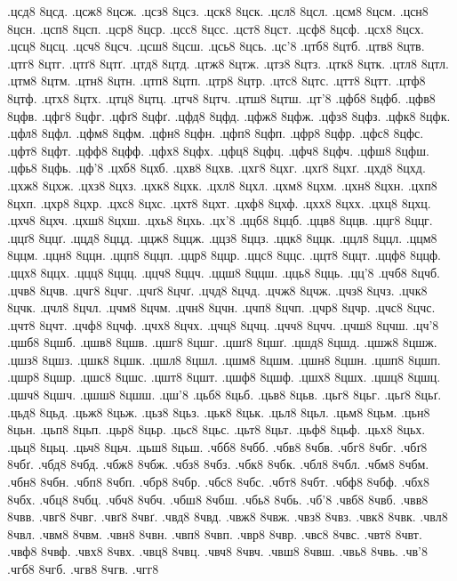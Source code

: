 {.цсд8
8цсд.
.цсж8
8цсж.
.цсз8
8цсз.
.цск8
8цск.
.цсл8
8цсл.
.цсм8
8цсм.
.цсн8
8цсн.
.цсп8
8цсп.
.цср8
8цср.
.цсс8
8цсс.
.цст8
8цст.
.цсф8
8цсф.
.цсх8
8цсх.
.цсц8
8цсц.
.цсч8
8цсч.
.цсш8
8цсш.
.цсь8
8цсь.
.цс'8
.цтб8
8цтб.
.цтв8
8цтв.
.цтг8
8цтг.
.цтґ8
8цтґ.
.цтд8
8цтд.
.цтж8
8цтж.
.цтз8
8цтз.
.цтк8
8цтк.
.цтл8
8цтл.
.цтм8
8цтм.
.цтн8
8цтн.
.цтп8
8цтп.
.цтр8
8цтр.
.цтс8
8цтс.
.цтт8
8цтт.
.цтф8
8цтф.
.цтх8
8цтх.
.цтц8
8цтц.
.цтч8
8цтч.
.цтш8
8цтш.
.цт'8
.цфб8
8цфб.
.цфв8
8цфв.
.цфг8
8цфг.
.цфґ8
8цфґ.
.цфд8
8цфд.
.цфж8
8цфж.
.цфз8
8цфз.
.цфк8
8цфк.
.цфл8
8цфл.
.цфм8
8цфм.
.цфн8
8цфн.
.цфп8
8цфп.
.цфр8
8цфр.
.цфс8
8цфс.
.цфт8
8цфт.
.цфф8
8цфф.
.цфх8
8цфх.
.цфц8
8цфц.
.цфч8
8цфч.
.цфш8
8цфш.
.цфь8
8цфь.
.цф'8
.цхб8
8цхб.
.цхв8
8цхв.
.цхг8
8цхг.
.цхґ8
8цхґ.
.цхд8
8цхд.
.цхж8
8цхж.
.цхз8
8цхз.
.цхк8
8цхк.
.цхл8
8цхл.
.цхм8
8цхм.
.цхн8
8цхн.
.цхп8
8цхп.
.цхр8
8цхр.
.цхс8
8цхс.
.цхт8
8цхт.
.цхф8
8цхф.
.цхх8
8цхх.
.цхц8
8цхц.
.цхч8
8цхч.
.цхш8
8цхш.
.цхь8
8цхь.
.цх'8
.ццб8
8ццб.
.ццв8
8ццв.
.ццг8
8ццг.
.ццґ8
8ццґ.
.ццд8
8ццд.
.ццж8
8ццж.
.ццз8
8ццз.
.ццк8
8ццк.
.ццл8
8ццл.
.ццм8
8ццм.
.ццн8
8ццн.
.ццп8
8ццп.
.ццр8
8ццр.
.ццс8
8ццс.
.ццт8
8ццт.
.ццф8
8ццф.
.ццх8
8ццх.
.ццц8
8ццц.
.ццч8
8ццч.
.ццш8
8ццш.
.цць8
8цць.
.цц'8
.цчб8
8цчб.
.цчв8
8цчв.
.цчг8
8цчг.
.цчґ8
8цчґ.
.цчд8
8цчд.
.цчж8
8цчж.
.цчз8
8цчз.
.цчк8
8цчк.
.цчл8
8цчл.
.цчм8
8цчм.
.цчн8
8цчн.
.цчп8
8цчп.
.цчр8
8цчр.
.цчс8
8цчс.
.цчт8
8цчт.
.цчф8
8цчф.
.цчх8
8цчх.
.цчц8
8цчц.
.цчч8
8цчч.
.цчш8
8цчш.
.цч'8
.цшб8
8цшб.
.цшв8
8цшв.
.цшг8
8цшг.
.цшґ8
8цшґ.
.цшд8
8цшд.
.цшж8
8цшж.
.цшз8
8цшз.
.цшк8
8цшк.
.цшл8
8цшл.
.цшм8
8цшм.
.цшн8
8цшн.
.цшп8
8цшп.
.цшр8
8цшр.
.цшс8
8цшс.
.цшт8
8цшт.
.цшф8
8цшф.
.цшх8
8цшх.
.цшц8
8цшц.
.цшч8
8цшч.
.цшш8
8цшш.
.цш'8
.цьб8
8цьб.
.цьв8
8цьв.
.цьг8
8цьг.
.цьґ8
8цьґ.
.цьд8
8цьд.
.цьж8
8цьж.
.цьз8
8цьз.
.цьк8
8цьк.
.цьл8
8цьл.
.цьм8
8цьм.
.цьн8
8цьн.
.цьп8
8цьп.
.цьр8
8цьр.
.цьс8
8цьс.
.цьт8
8цьт.
.цьф8
8цьф.
.цьх8
8цьх.
.цьц8
8цьц.
.цьч8
8цьч.
.цьш8
8цьш.
.чбб8
8чбб.
.чбв8
8чбв.
.чбг8
8чбг.
.чбґ8
8чбґ.
.чбд8
8чбд.
.чбж8
8чбж.
.чбз8
8чбз.
.чбк8
8чбк.
.чбл8
8чбл.
.чбм8
8чбм.
.чбн8
8чбн.
.чбп8
8чбп.
.чбр8
8чбр.
.чбс8
8чбс.
.чбт8
8чбт.
.чбф8
8чбф.
.чбх8
8чбх.
.чбц8
8чбц.
.чбч8
8чбч.
.чбш8
8чбш.
.чбь8
8чбь.
.чб'8
.чвб8
8чвб.
.чвв8
8чвв.
.чвг8
8чвг.
.чвґ8
8чвґ.
.чвд8
8чвд.
.чвж8
8чвж.
.чвз8
8чвз.
.чвк8
8чвк.
.чвл8
8чвл.
.чвм8
8чвм.
.чвн8
8чвн.
.чвп8
8чвп.
.чвр8
8чвр.
.чвс8
8чвс.
.чвт8
8чвт.
.чвф8
8чвф.
.чвх8
8чвх.
.чвц8
8чвц.
.чвч8
8чвч.
.чвш8
8чвш.
.чвь8
8чвь.
.чв'8
.чгб8
8чгб.
.чгв8
8чгв.
.чгг8
}
